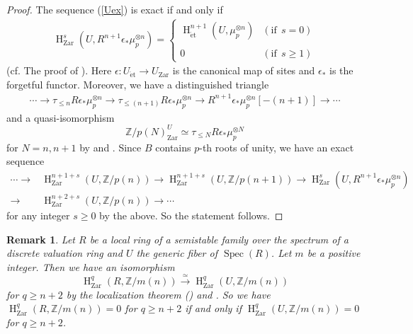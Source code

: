 \documentclass{article}
\newtheorem{rem}[thm]{\indent \sc Remark}
\newcommand{\spec}{\operatorname{Spec}}
\newcommand{\et}{\mathrm{\acute{e}t}}
\newcommand{\Zar}{\mathrm{Zar}}
\newcommand{\HO}{\operatorname{H}}
\begin{document}
%
\begin{proof}\upshape
The sequence (\ref{Uex}) is exact
if and only if
%
\begin{align*}
\HO^{s}_{\Zar}(
U,
R^{n+1}\epsilon_{*}
\mu_{p}^{\otimes n}
)
=
%
\begin{cases}
\HO^{n+1}_{\et}(
U, 
\mu_{p}^{\otimes n}
)
& (\textrm{if}~~s=0) \\
\\
0
& (\textrm{if}~~s\geq 1)
\end{cases}
%    
\end{align*}
%
(cf. The proof of \cite[Lemma 5.3 (i)]{Sak5}). 
Here $\epsilon: U_{\et}\to U_{\Zar}$ is the canonical map
of sites and $\epsilon_{*}$ is the forgetful functor.
Moreover, 
we have a distinguished triangle
%
\begin{align*}
\cdots
\to  
\tau_{\leq n}R\epsilon_{*}\mu_{p}^{\otimes n}
\to
\tau_{\leq (n+1)}R\epsilon_{*}\mu_{p}^{\otimes n}
\to
R^{n+1}\epsilon_{*}\mu_{p}^{\otimes n}[-(n+1)]
\to\cdots
\end{align*}
%
and a quasi-isomorphism
%
\begin{equation*}
\mathbb{Z}/p(N)_{\Zar}^{U}
\simeq
\tau_{\leq N}R\epsilon_{*}
\mu_{p}^{\otimes N}
\end{equation*}
%
for $N=n, n+1$ by \cite[p.774, Theorem 1.2]{Ge} and \cite{V2}. 
Since $B$ contains $p$-th roots of unity, we have an exact sequence
%
\begin{align*}
\cdots\to
&\HO^{n+1+s}_{\Zar}(
U, \mathbb{Z}/p(n)
)
\to
\HO^{n+1+s}_{\Zar}(
U, \mathbb{Z}/p(n+1)
)
\to
\HO^{s}_{\Zar}(
U, 
R^{n+1}\epsilon_{*}\mu_{p}^{\otimes n}
)
\\
\to
&\HO^{n+2+s}_{\Zar}(
U,
\mathbb{Z}/p(n)
)
\to\cdots
\end{align*}
%
for any integer $s\geq 0$ by the above.
So the statement follows.
\end{proof}
%

%
\begin{rem}\upshape\label{revanimot}
Let $R$ be a local ring of a semistable family over the spectrum of a discrete valuation ring
and $U$ the generic fiber of $\spec(R)$.
Let $m$ be a positive integer. Then we have an isomorphism
%
\begin{equation*}
\HO^{q}_{\Zar}(
R,
\mathbb{Z}/m(n)
)
\xrightarrow{\simeq}
\HO^{q}_{\Zar}(
U,
\mathbb{Z}/m(n)
)
\end{equation*}
%
for $q\geq n+2$ by the localization theorem (\cite[p.779, Theorem 3.2]{Ge}) and \cite[Proposition 2.1]{Sak4}.
So we have 
%
\begin{math}
\HO^{q}_{\Zar}(
R, \mathbb{Z}/m(n)
)    
=0
\end{math}
%
for $q\geq n+2$
if and only if
%
\begin{math}
\HO^{q}_{\Zar}(
U, \mathbb{Z}/m(n)
)    
=0
\end{math}
%
for $q\geq n+2$.
\end{rem}
%
\end{document}
